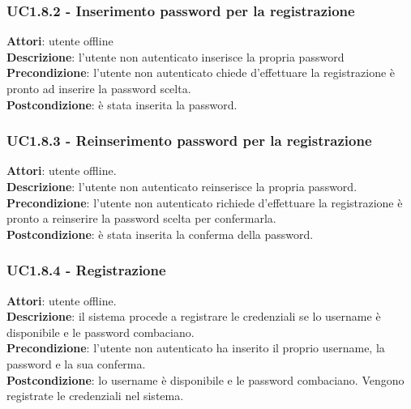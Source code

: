 	\subsubsection{UC1.8.2 - Inserimento password per la registrazione} {
		\label{uc1.8.2}
		\textbf{Attori}: utente offline \\
		\textbf{Descrizione}: l'utente non autenticato inserisce la propria password	\\
		\textbf{Precondizione}: l'utente non autenticato chiede d'effettuare la registrazione è pronto ad inserire la password scelta.	\\
		\textbf{Postcondizione}: è stata inserita la password.
		}
	\subsubsection{UC1.8.3 - Reinserimento password per la registrazione} {
		\label{uc1.8.3}
		\textbf{Attori}: utente offline. \\
		\textbf{Descrizione}: l'utente non autenticato reinserisce la propria password.	\\
		\textbf{Precondizione}: l'utente non autenticato richiede d'effettuare la registrazione è pronto a reinserire la password scelta per confermarla.	\\
		\textbf{Postcondizione}: è stata inserita la conferma della password.
		}
	\subsubsection{UC1.8.4 - Registrazione} {
		\label{uc1.8.4}
		\textbf{Attori}: utente offline. \\
		\textbf{Descrizione}: il sistema procede a registrare le credenziali se lo username è disponibile e le password combaciano.	\\
		\textbf{Precondizione}: l'utente non autenticato ha inserito il proprio username, la password e la sua conferma.	\\
		\textbf{Postcondizione}: lo username è disponibile e le password combaciano. Vengono registrate le credenziali nel sistema.
		}